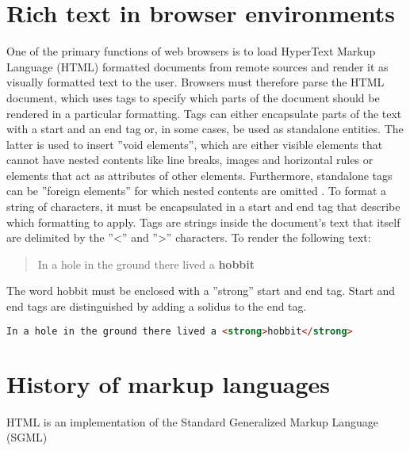 \section{Rich text in browser environments}

One of the primary functions of web browsers is to load HyperText Markup Language (HTML) formatted documents from remote sources and render it as visually formatted text to the user. Browsers must therefore parse the HTML document, which uses tags to specify which parts of the document should be rendered in a particular formatting. Tags can either encapsulate parts of the text with a start and an end tag or, in some cases, be used as standalone entities. 
The latter is used to insert ''void elements'', which are either visible elements that cannot have nested contents like line breaks, images and horizontal rules or elements that act as attributes of other elements. Furthermore, standalone tags can be ''foreign elements'' for which nested contents are omitted \cite[Elements]{HTML5}. 
To format a string of characters, it must be encapsulated in a start and end tag that describe which formatting to apply. Tags are strings inside the document's text that itself are delimited by the ''<'' and ''>'' characters. To render the following text: 

\begin{quotation}
In a hole in the ground there lived a \textbf{hobbit}
\end{quotation}

The word hobbit must be enclosed with a ''strong'' start and end tag. Start and end tags are distinguished by adding a solidus to the end tag.

\begin{lstlisting}[language=html, caption=Text formatted as bold, label=lst:div-contenteditable]
In a hole in the ground there lived a <strong>hobbit</strong>
\end{lstlisting}



\section{History of markup languages}

HTML is an implementation of the Standard Generalized Markup Language (SGML)